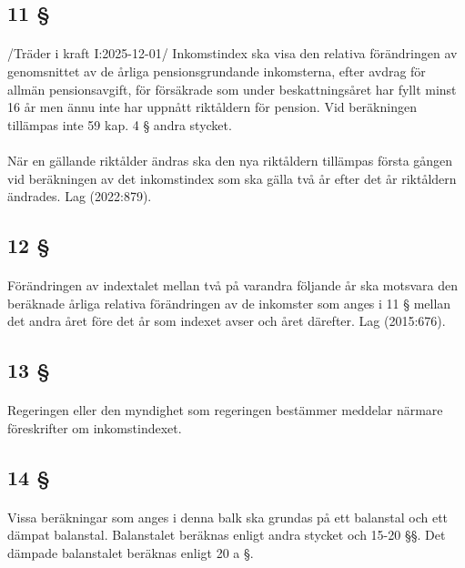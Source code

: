 \documentclass[a4paper,notitlepage,openany,10pt]{book}
\begin{document}
\subsection*{11 §}
\paragraph*{}
/Träder i kraft I:2025-12-01/
Inkomstindex ska visa den relativa förändringen av genomsnittet av de årliga pensionsgrundande inkomsterna, efter avdrag för allmän pensionsavgift, för försäkrade som under beskattningsåret har fyllt minst 16 år men ännu inte har uppnått riktåldern för pension. Vid beräkningen tillämpas inte 59 kap. 4 § andra stycket.
\paragraph*{}
När en gällande riktålder ändras ska den nya riktåldern tillämpas första gången vid beräkningen av det inkomstindex som ska gälla två år efter det år riktåldern ändrades.
Lag (2022:879).
\subsection*{12 §}
\paragraph*{}
Förändringen av indextalet mellan två på varandra följande år ska motsvara den beräknade årliga relativa förändringen av de inkomster som anges i 11 § mellan det andra året före det år som indexet avser och året därefter.
Lag (2015:676).
\subsection*{13 §}
\paragraph*{}
Regeringen eller den myndighet som regeringen bestämmer meddelar närmare föreskrifter om inkomstindexet.
\subsection*{14 §}
\paragraph*{}
Vissa beräkningar som anges i denna balk ska grundas på ett balanstal och ett dämpat balanstal. Balanstalet beräknas enligt andra stycket och 15-20 §§. Det dämpade balanstalet beräknas enligt 20 a §.
\end{document}
